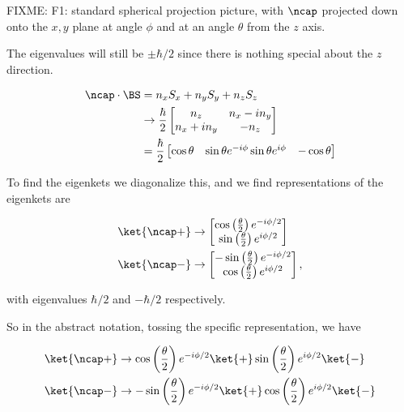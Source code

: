 FIXME: F1: standard spherical projection picture, with $\ncap$ projected down onto the $x,y$ plane at angle $\phi$ and at an angle $\theta$ from the $z$ axis.

The eigenvalues will still be $\pm \hbar/2$ since there is nothing special about the $z$ direction.

\begin{equation}\label{eqn:qmTwoL14:820}
\begin{aligned}
\ncap \cdot \BS &= 
n_x S_x
+n_y S_y
+n_z S_z \\
&\rightarrow
\frac{\hbar}{2} 
\begin{bmatrix}
n_z & n_x - i n_y \\
n_x + i n_y & -n_z
\end{bmatrix} \\
&=
\frac{\hbar}{2} 
\begin{bmatrix}
\cos\theta & \sin\theta e^{-i\phi}
\sin\theta e^{i\phi} & -\cos\theta
\end{bmatrix}
\end{aligned}
\end{equation}

To find the eigenkets we diagonalize this, and we find representations of the eigenkets are

\begin{align}\label{eqn:qmTwoL14:390}
\ket{\ncap+} &\rightarrow 
\begin{bmatrix}
\cos\left(\frac{\theta}{2}\right) e^{-i\phi/2} \\
\sin\left(\frac{\theta}{2}\right) e^{i\phi/2} 
\end{bmatrix} \\
\ket{\ncap-} &\rightarrow 
\begin{bmatrix}
-\sin\left(\frac{\theta}{2}\right) e^{-i\phi/2} \\
\cos\left(\frac{\theta}{2}\right) e^{i\phi/2} 
\end{bmatrix},
\end{align}

with eigenvalues $\hbar/2$ and $-\hbar/2$ respectively.

So in the abstract notation, tossing the specific representation, we have

\begin{align}\label{eqn:qmTwoL14:410}
\ket{\ncap+} &\rightarrow 
\cos\left(\frac{\theta}{2}\right) e^{-i\phi/2} \ket{+}
\sin\left(\frac{\theta}{2}\right) e^{i\phi/2}  \ket{-} \\
\ket{\ncap-} &\rightarrow 
-\sin\left(\frac{\theta}{2}\right) e^{-i\phi/2} \ket{+}
\cos\left(\frac{\theta}{2}\right) e^{i\phi/2}  \ket{-}
\end{align}

